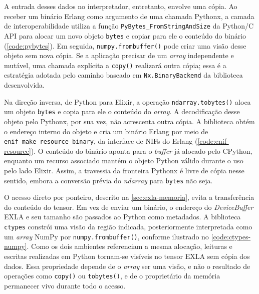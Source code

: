 A entrada desses dados no interpretador, entretanto, envolve uma cópia. Ao receber um binário Erlang como argumento de uma chamada Pythonx, a camada de interoperabilidade utiliza a função \texttt{PyBytes\_FromStringAndSize} da Python/C \gls{API} \citep{python2024} para alocar um novo objeto \texttt{bytes} e copiar para ele o conteúdo do binário (\autoref{code:pybytes}). Em seguida, \texttt{numpy.frombuffer()} pode criar uma visão desse objeto sem nova cópia. Se a aplicação precisar de um \textit{array} independente e mutável, uma chamada explícita a \texttt{copy()} realizará outra cópia; essa é a estratégia adotada pelo caminho baseado em \texttt{Nx.BinaryBackend} da biblioteca desenvolvida.

\begin{sourcecode}[htb]
\caption{Assinatura da função PyBytes\_FromStringAndSize da Python/C API}
\label{code:pybytes}
\end{sourcecode}

Na direção inversa, de Python para Elixir, a operação \texttt{ndarray.tobytes()} aloca um objeto \texttt{bytes} e copia para ele o conteúdo do \textit{array}. A decodificação desse objeto pelo Pythonx, por sua vez, não acrescenta outra cópia. A biblioteca obtém o endereço interno do objeto e cria um binário Erlang por meio de \texttt{enif\_make\_resource\_binary}, da interface de \glspl{NIF} do Erlang \citep{erlnif2024} (\autoref{code:enif-resource}). O conteúdo do binário aponta para o \textit{buffer} já alocado pelo CPython, enquanto um recurso associado mantém o objeto Python válido durante o uso pelo lado Elixir. Assim, a travessia da fronteira Pythonx é livre de cópia nesse sentido, embora a conversão prévia do \textit{ndarray} para \texttt{bytes} não seja.

\begin{sourcecode}[htb]
\caption{Assinatura da função enif\_make\_resource\_binary da API de NIFs do Erlang}
\label{code:enif-resource}
\end{sourcecode}

O acesso direto por ponteiro, descrito na \autoref{sec:exla-memoria}, evita a transferência do conteúdo do tensor. Em vez de enviar um binário, o endereço do \textit{DeviceBuffer} \gls{EXLA} e seu tamanho são passados ao Python como metadados. A biblioteca \texttt{ctypes} constrói uma visão da região indicada, posteriormente interpretada como um \textit{array} NumPy por \texttt{numpy.frombuffer()}, conforme ilustrado no \autoref{code:ctypes-numpy}. Como os dois ambientes referenciam a mesma alocação, leituras e escritas realizadas em Python tornam-se visíveis no tensor \gls{EXLA} sem cópia dos dados. Essa propriedade depende de o \textit{array} ser uma visão, e não o resultado de operações como \texttt{copy()} ou \texttt{tobytes()}, e de o proprietário da memória permanecer vivo durante todo o acesso.

